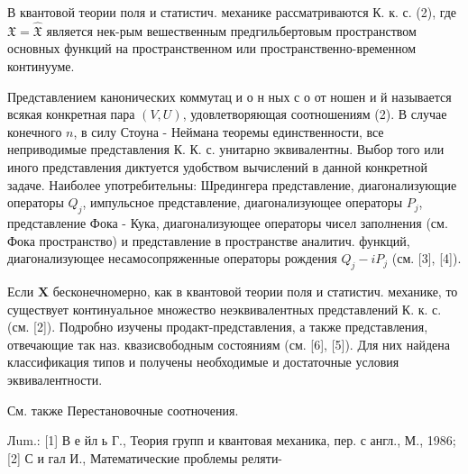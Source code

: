 \documentclass[10pt]{article}
\begin{document}
В квантовой теории поля и статистич. механике рассматриваются К. к. с. (2), где $\mathfrak{X}=\hat{\mathfrak{X}}$ является нек-рым вешественным предгильбертовым пространством основных функций на пространственном или пространственно-временном континууме.



Представлением канонических коммутац и о н ных с о от ношен и й называется всякая конкретная пара $(V, U)$, удовлетворяющая соотношениям (2). В случае конечного $n$, в силу Стоуна - Неймана теоремы единственности, все неприводимые представления К. К. с. унитарно эквивалентны. Выбор того или иного представления диктуется удобством вычислений в данной конкретной задаче. Наиболее употребительны: Шредингера представление, диагонализующие операторы $Q_{j}$, импульсное представление, диагонализующее операторы $P_{j}$, представление Фока - Кука, диагонализующее операторы чисел заполнения (см. Фока пространство) и представление в пространстве аналитич. функций, диагонализующее несамосопряженные операторы рождения $Q_{j}-i P_{j}$ (см. [3], [4]).



Если $\boldsymbol{X}$ бесконечномерно, как в квантовой теории поля и статистич. механике, то существует континуальное множество неэквивалентных представлений К. к. с. (см. [2]). Подробно изучены продакт-представления, а также представления, отвечающие так наз. квазисвободным состояниям (см. [6], [5]). Для них найдена классификация типов и получены необходимые и достаточные условия эквивалентности.



См. также Перестановочные соотночения.



Лum.: [1] В е йл ь Г., Теория групп и квантовая механика, пер. с англ., М., 1986; [2] С и гал И., Математические проблемы реляти-
\end{document}
